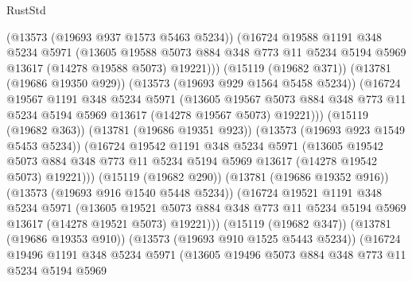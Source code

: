 \begin{lexlean}{RustStd}
\begin{coremodule}
                (@13573 (@19693 @937 @1573 @5463 @5234))
                (@16724
                  @19588
                  @1191
                  @348
                  @5234
                  @5971
                  (@13605
                    @19588
                    @5073
                    @884
                    @348
                    @773
                    @11
                    @5234
                    @5194
                    @5969
                    @13617
                    (@14278 @19588 @5073)
                    @19221)))
              (@15119 (@19682 @371))
              (@13781 (@19686 @19350 @929))
              (@13573 (@19693 @929 @1564 @5458 @5234))
              (@16724
                @19567
                @1191
                @348
                @5234
                @5971
                (@13605
                  @19567
                  @5073
                  @884
                  @348
                  @773
                  @11
                  @5234
                  @5194
                  @5969
                  @13617
                  (@14278 @19567 @5073)
                  @19221)))
            (@15119 (@19682 @363))
            (@13781 (@19686 @19351 @923))
            (@13573 (@19693 @923 @1549 @5453 @5234))
            (@16724
              @19542
              @1191
              @348
              @5234
              @5971
              (@13605
                @19542
                @5073
                @884
                @348
                @773
                @11
                @5234
                @5194
                @5969
                @13617
                (@14278 @19542 @5073)
                @19221)))
          (@15119 (@19682 @290))
          (@13781 (@19686 @19352 @916))
          (@13573 (@19693 @916 @1540 @5448 @5234))
          (@16724
            @19521
            @1191
            @348
            @5234
            @5971
            (@13605
              @19521
              @5073
              @884
              @348
              @773
              @11
              @5234
              @5194
              @5969
              @13617
              (@14278 @19521 @5073)
              @19221)))
        (@15119 (@19682 @347))
        (@13781 (@19686 @19353 @910))
        (@13573 (@19693 @910 @1525 @5443 @5234))
        (@16724
          @19496
          @1191
          @348
          @5234
          @5971
          (@13605
            @19496
            @5073
            @884
            @348
            @773
            @11
            @5234
            @5194
            @5969

\end{coremodule}
\end{lexlean}
